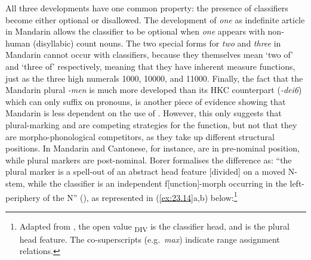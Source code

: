 \documentclass[output=paper]{langsci/langscibook}
\begin{document}
All three developments have one common property: the presence of classifiers
become either optional or disallowed. The development of \emph{one} as
indefinite article in Mandarin allows the classifier to be optional when
\emph{one} appears with non-human (disyllabic) count nouns. The two special
forms for \emph{two} and \emph{three} in Mandarin cannot occur with
classifiers, because they themselves mean ‘two of’ and ‘three of’ respectively,
meaning that they have inherent measure functions, just as the three high
numerals 1000, 10000, and 11000. Finally, the fact that the Mandarin plural
\emph{-men} is much more developed than its \gls{HKC} counterpart
(\emph{-dei6}) which can only suffix on pronouns, is another piece of evidence
showing that Mandarin  is less dependent on the use of .
However, this only suggests that plural-marking and  are competing
strategies for the  function, but not that they are
morpho-phonological competitors, as they take up different structural
positions. In Mandarin and Cantonese, for instance,  are in
pre-nominal position, while plural markers are post-nominal. Borer formalises
the difference as: “the plural marker is a spell-out of an abstract head
feature  [divided] on a moved N-stem, while the
classifier is an independent f[unction]-morph occurring in the
left-periphery of the N” (\citeyear[95]{Borer2005}), as represented in
(\ref{ex:23.14}a,b)
below:\footnote{Adapted from \citet[95]{Borer2005}, the open value
    \textsubscript{DIV} is the classifier head, and
 is the plural head feature. The co-superscripts (e.g.\ \emph{max})
indicate range assignment relations.}\newpage
\end{document}
